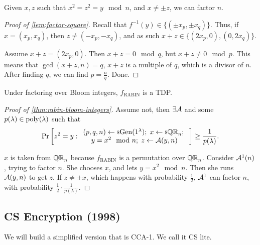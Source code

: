 \begin{lemma} \label{lem:factor-square}
	Given $x, z$ such that $x^2 = z^2 = y \mod n$, and $x \neq \pm z$, we can factor $n$.
\end{lemma}

\begin{proof}[Proof of \cref{lem:factor-square}]
	Recall that $f^{-1}(y) \in \{ (\pm x_p, \pm x_q) \}$.
	Thus, if $x = (x_p, x_q)$, then $z \neq (-x_p, -x_q)$, and as such $x+z \in \{ (2x_p, 0), (0, 2x_q)\}$.

	Assume $x+z = (2x_p, 0)$.
	Then $x+z = 0 \mod q$, but $x+z \neq 0 \mod p$.
	This means that $\gcd(x+z,n) = q$, \ie $x+z$ is a multiple of $q$, which is a divisor of $n$.
	After finding $q$, we can find $p = \frac{n}{q}$.
	Done.
\end{proof}

\begin{theorem} \label{thm:rabin-bloom-integers}
	Under factoring over Bloom integers, $f_{\mathrm{RABIN}}$ is a \ac{TDP}.
\end{theorem}

\begin{proof}[Proof of \cref{thm:rabin-bloom-integers}]
	Assume not, then $\exists \Adv$ and some $p(\lambda) \in \poly(\lambda)$ such that
	\begin{equation*}
		\Pr{
			z^2 = y :
			\begin{array}{c}
			(p, q, n) \rand{\Gen(1^{\lambda})}; \;
			x \rand{\QR[n]}; \; \\
			y = x^2 \mod n; \;
			z \from \Adv(y, n)
			\end{array}
		}
		\ge \frac{1}{p(\lambda)}.
	\end{equation*}

	$x$ is taken from $\QR[n]$ because $f_{\mathrm{RABIN}}$ is a permutation over $\QR[n]$.
	Consider $\Adv^1(n)$, trying to factor $n$.
	She chooses $x$, and lets $y = x^2 \mod n$.
	Then she runs $\Adv(y, n)$ to get $z$.
	If $z \neq \pm x$, which happens with probability $\frac{1}{2}$, $\Adv^1$ can factor $n$, with probability $\frac{1}{2} \cdot \frac{1}{p(\lambda)}$.
\end{proof}

\subsection{\acl{CS} Encryption (1998)}

We will build a simplified version that is \ac{CCA}-1.
We call it \ac{CS} lite.

